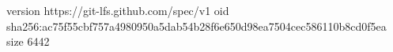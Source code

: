 version https://git-lfs.github.com/spec/v1
oid sha256:ac75f55cbf757a4980950a5dab54b28f6e650d98ea7504cec586110b8cd0f5ea
size 6442
